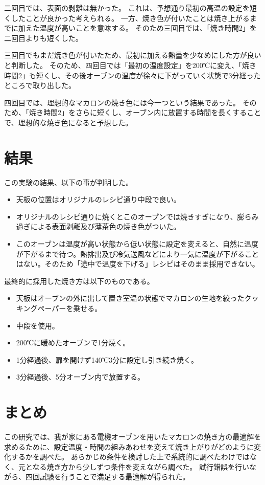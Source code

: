 \documentclass[uplatex,dvipdfmx,a4j,12pt]{jsarticle}
\begin{document}
二回目では、表面の剥離は無かった。
これは、予想通り最初の高温の設定を短くしたことが良かった考えられる。
一方、焼き色が付いたことは焼き上がるまでに加えた温度が高いことを意味する。
そのため三回目では、「焼き時間2」を二回目よりも短くした。

三回目でもまだ焼き色が付いたため、最初に加える熱量を少なめにした方が良いと判断した。
そのため、四回目では「最初の温度設定」を200℃に変え、「焼き時間2」も短くし、その後オーブンの温度が徐々に下がっていく状態で3分経ったところで取り出した。

四回目では、理想的なマカロンの焼き色には今一つという結果であった。
そのため、「焼き時間2」をさらに短くし、オーブン内に放置する時間を長くすることで、理想的な焼き色になると予想した。

\section{結果}

この実験の結果、以下の事が判明した。
\begin{itemize}
    \item 天板の位置はオリジナルのレシピ通り中段で良い。
    \item オリジナルのレシピ通りに焼くとこのオープンでは焼きすぎになり、膨らみ過ぎによる表面剥離及び薄茶色の焼き色がついた。
    \item このオーブンは温度が高い状態から低い状態に設定を変えると、自然に温度が下がるまで待つ。熱排出及び冷気送風などにより一気に温度が下がることはない。そのため「途中で温度を下げる」レシピはそのまま採用できない。
\end{itemize}

最終的に採用した焼き方は以下のものである。
\begin{itemize}
    \item 天板はオーブンの外に出して置き室温の状態でマカロンの生地を絞ったクッキングペーパーを乗せる。
    \item 中段を使用。
    \item 200℃に暖めたオープンで1分焼く。
    \item 1分経過後、扉を開けず140℃3分に設定し引き続き焼く。
    \item 3分経過後、5分オーブン内で放置する。
\end{itemize}


\section{まとめ}

この研究では、我が家にある電機オーブンを用いたマカロンの焼き方の最適解を求めるために、設定温度・時間の組みあわせを変えて焼き上がりがどのように変化するかを調べた。
あらかじめ条件を検討した上で系統的に調べたわけではなく、元となる焼き方から少しずつ条件を変えながら調べた。 
試行錯誤を行いながら、四回試験を行うことで満足する最適解が得られた。
\end{document}
